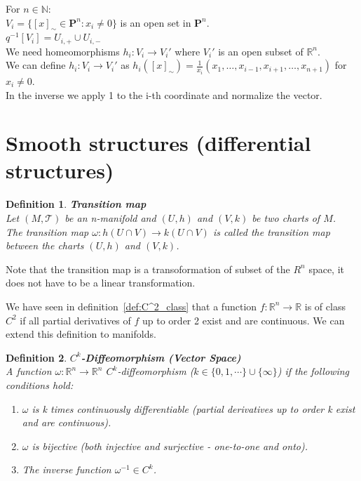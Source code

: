 \documentclass[11pt]{book} %
\newtheorem{definition}{Definition}[section]
\begin{document}
For $n \in \mathbb{N}$: \\
\( V_i = \{ [x]_\sim \in \mathbf{P}^n : x_i \neq 0 \} \) is an open set in \( \mathbf{P}^n \). \\
\( q^{-1}[V_i] = U_{i, +} \cup U_{i, -} \) \\
We need homeomorphisms \( h_i: V_i \to V_i' \) where \( V_i' \) is an open subset of \( \mathbb{R}^n \). \\
We can define \( h_i: V_i \to V_i' \) as \( h_i([x]_\sim) = \frac{1}{x_i} (x_1, \ldots, x_{i-1}, x_{i+1}, \ldots, x_{n+1}) \) for \( x_i \neq 0 \). \\
In the inverse we apply 1 to the i-th coordinate and normalize the vector.




\section{Smooth structures (differential structures)}

\begin{definition}{\textbf{Transition map}} \\
    Let \( (M, \mathcal{T}) \) be an n-manifold and \( (U, h) \) and \( (V, k) \) be two charts of \( M \). \\
    The transition map \( \omega : h(U \cap V) \to k(U \cap V) \) is called the transition map between the charts \( (U, h) \) and \( (V, k) \).
\end{definition}

Note that the transition map is a transoformation of subset of the $R^n$ space, it does not have to be a linear transformation.

We have seen in definition~\ref{def:C^2_class} that a function \( f: \mathbb{R}^n \to \mathbb{R} \) is of class \( C^2 \) 
if all partial derivatives of \( f \) up to order 2 exist and are continuous. We can extend this definition to manifolds.

\begin{definition}{\textbf{$C^k$-Diffeomorphism (Vector Space)}} \\
    A function \( \omega : \mathbb{R}^n \to \mathbb{R}^n \) $C^k$-diffeomorphism ($ k \in \{0, 1, \cdots\} \cup \{ \infty \} $) if the following conditions hold:
    \begin{enumerate}
        \item \( \omega \) is k times continuously differentiable (partial derivatives up to order k exist and are continuous).
        \item \( \omega \) is bijective (both injective and surjective - one-to-one and onto).
        \item The inverse function \( \omega^{-1} \in C^k \).
    \end{enumerate}
\end{definition}
\end{document}
